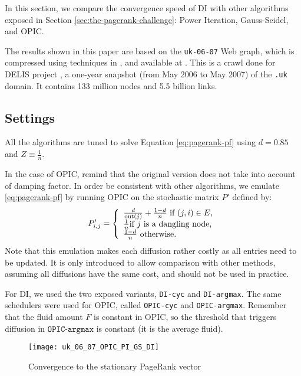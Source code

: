 \documentclass{llncs}
\begin{document}
\label{sec:experiments}
In this section, we compare the convergence speed of DI with other algorithms exposed in Section \ref{sec:the-pagerank-challenge}: Power Iteration, Gauss-Seidel, and OPIC.

The results shown in this paper are based on the 
\texttt{uk-06-07} Web graph, which is compressed using techniques in \cite{BRSLLP},\cite{BV03} and available at \cite{webgraph}. This is a crawl done for DELIS project \cite{DELISProj}, a one-year snapshot (from May 2006 to May 2007) of the \texttt{.uk} domain. It contains 133 million nodes and  5.5 billion links.

\subsection{Settings}

All the algorithms are tuned to solve Equation \eqref{eq:pagerank-pf} using $ d=0.85 $ and $ Z\equiv \frac{1}{n} $.

In the case of OPIC, remind that the original version does not take into account of damping factor. In order be consistent with other algorithms, we emulate \eqref{eq:pagerank-pf} by running OPIC on the stochastic matrix 
$ P' $ defined by:
\begin{equation}
P'_{i,j}=\left\{ 
\begin{array}{l}
\frac{d}{\textrm{out}(j)}+\frac{1-d}{n} \text{ if $ (j,i) \in E$,}\\
\frac{1}{n} \text{if $ j $ is a dangling node,}\\
\frac{1-d}{n} \text{ otherwise.}
\end{array}
\right.
\label{eq:def-popic}
\end{equation}
Note that this emulation makes each diffusion rather costly as all entries need to be updated. It is only introduced to allow comparison with other methods, assuming all diffusions have the same cost, and should not be used in practice.

For DI, we used the two exposed variants, \texttt{DI-cyc} and \texttt{DI-argmax}. The same schedulers were used for OPIC, called 
\texttt{OPIC-cyc} and \texttt{OPIC-argmax}.
Remember that the fluid amount $F$ is constant in OPIC, so the threshold that triggers diffusion in $\texttt{OPIC-argmax}$ is constant (it is the average fluid).
\begin{figure}
\begin{center}


\texttt{[image: uk\_06\_07\_OPIC\_PI\_GS\_DI]}
  
  \caption{Convergence to the stationary PageRank vector}
  \label{fig:exp}
 \end{center}
\end{figure}
\end{document}
